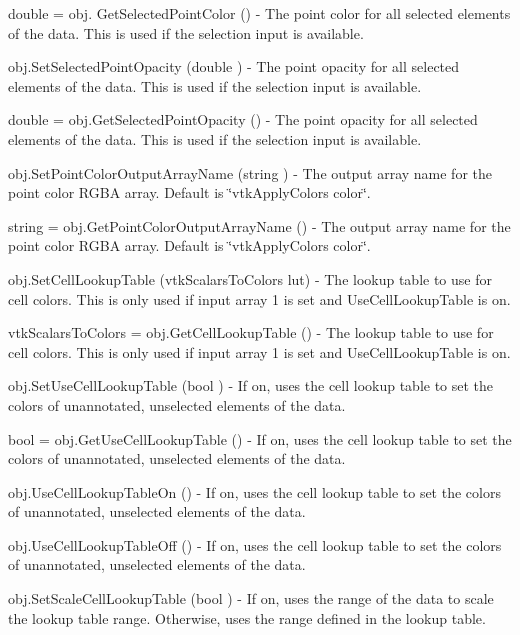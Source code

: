 \begin{DoxyItemize}
\item {\ttfamily double = obj. Get\-Selected\-Point\-Color ()} -\/ The point color for all selected elements of the data. This is used if the selection input is available.  
\item {\ttfamily obj.\-Set\-Selected\-Point\-Opacity (double )} -\/ The point opacity for all selected elements of the data. This is used if the selection input is available.  
\item {\ttfamily double = obj.\-Get\-Selected\-Point\-Opacity ()} -\/ The point opacity for all selected elements of the data. This is used if the selection input is available.  
\item {\ttfamily obj.\-Set\-Point\-Color\-Output\-Array\-Name (string )} -\/ The output array name for the point color R\-G\-B\-A array. Default is \char`\"{}vtk\-Apply\-Colors color\char`\"{}.  
\item {\ttfamily string = obj.\-Get\-Point\-Color\-Output\-Array\-Name ()} -\/ The output array name for the point color R\-G\-B\-A array. Default is \char`\"{}vtk\-Apply\-Colors color\char`\"{}.  
\item {\ttfamily obj.\-Set\-Cell\-Lookup\-Table (vtk\-Scalars\-To\-Colors lut)} -\/ The lookup table to use for cell colors. This is only used if input array 1 is set and Use\-Cell\-Lookup\-Table is on.  
\item {\ttfamily vtk\-Scalars\-To\-Colors = obj.\-Get\-Cell\-Lookup\-Table ()} -\/ The lookup table to use for cell colors. This is only used if input array 1 is set and Use\-Cell\-Lookup\-Table is on.  
\item {\ttfamily obj.\-Set\-Use\-Cell\-Lookup\-Table (bool )} -\/ If on, uses the cell lookup table to set the colors of unannotated, unselected elements of the data.  
\item {\ttfamily bool = obj.\-Get\-Use\-Cell\-Lookup\-Table ()} -\/ If on, uses the cell lookup table to set the colors of unannotated, unselected elements of the data.  
\item {\ttfamily obj.\-Use\-Cell\-Lookup\-Table\-On ()} -\/ If on, uses the cell lookup table to set the colors of unannotated, unselected elements of the data.  
\item {\ttfamily obj.\-Use\-Cell\-Lookup\-Table\-Off ()} -\/ If on, uses the cell lookup table to set the colors of unannotated, unselected elements of the data.  
\item {\ttfamily obj.\-Set\-Scale\-Cell\-Lookup\-Table (bool )} -\/ If on, uses the range of the data to scale the lookup table range. Otherwise, uses the range defined in the lookup table.  

\end{DoxyItemize}
